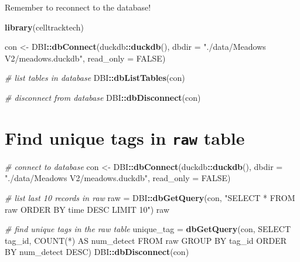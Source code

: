 \documentclass[
]{book}
\newenvironment{Shaded}{\begin{snugshade}}{\end{snugshade}}
\newcommand{\AttributeTok}[1]{\textcolor[rgb]{0.13,0.29,0.53}{#1}}
\newcommand{\CommentTok}[1]{\textcolor[rgb]{0.56,0.35,0.01}{\textit{#1}}}
\newcommand{\ConstantTok}[1]{\textcolor[rgb]{0.56,0.35,0.01}{#1}}
\newcommand{\FunctionTok}[1]{\textcolor[rgb]{0.13,0.29,0.53}{\textbf{#1}}}
\newcommand{\NormalTok}[1]{#1}
\newcommand{\OtherTok}[1]{\textcolor[rgb]{0.56,0.35,0.01}{#1}}
\newcommand{\SpecialCharTok}[1]{\textcolor[rgb]{0.81,0.36,0.00}{\textbf{#1}}}
\newcommand{\StringTok}[1]{\textcolor[rgb]{0.31,0.60,0.02}{#1}}
\begin{document}
Remember to reconnect to the database!

\begin{Shaded}
\begin{Highlighting}[]
\FunctionTok{library}\NormalTok{(celltracktech)}

\NormalTok{con }\OtherTok{\textless{}{-}}\NormalTok{ DBI}\SpecialCharTok{::}\FunctionTok{dbConnect}\NormalTok{(duckdb}\SpecialCharTok{::}\FunctionTok{duckdb}\NormalTok{(), }
                      \AttributeTok{dbdir =} \StringTok{"./data/Meadows V2/meadows.duckdb"}\NormalTok{, }
                      \AttributeTok{read\_only =} \ConstantTok{FALSE}\NormalTok{)}

\CommentTok{\# list tables in database}
\NormalTok{DBI}\SpecialCharTok{::}\FunctionTok{dbListTables}\NormalTok{(con)}

\CommentTok{\# disconnect from database}
\NormalTok{DBI}\SpecialCharTok{::}\FunctionTok{dbDisconnect}\NormalTok{(con)}
\end{Highlighting}
\end{Shaded}

\section{\texorpdfstring{Find unique tags in \texttt{raw} table}{Find unique tags in raw table}}\label{find-unique-tags-in-raw-table}

\begin{Shaded}
\begin{Highlighting}[]
\CommentTok{\# connect to database}
\NormalTok{con }\OtherTok{\textless{}{-}}\NormalTok{ DBI}\SpecialCharTok{::}\FunctionTok{dbConnect}\NormalTok{(duckdb}\SpecialCharTok{::}\FunctionTok{duckdb}\NormalTok{(), }
                      \AttributeTok{dbdir =} \StringTok{"./data/Meadows V2/meadows.duckdb"}\NormalTok{, }
                      \AttributeTok{read\_only =} \ConstantTok{FALSE}\NormalTok{)}

\CommentTok{\# list last 10 records in raw}
\NormalTok{raw }\OtherTok{=}\NormalTok{ DBI}\SpecialCharTok{::}\FunctionTok{dbGetQuery}\NormalTok{(con, }\StringTok{"SELECT * FROM raw}
\StringTok{                           ORDER BY time DESC}
\StringTok{                           LIMIT 10"}\NormalTok{)}
\NormalTok{raw}

\CommentTok{\# find unique tags in the raw table}
\NormalTok{unique\_tag }\OtherTok{=} \FunctionTok{dbGetQuery}\NormalTok{(con,}
                        \StringTok{\textquotesingle{}SELECT tag\_id, COUNT(*) AS num\_detect}
\StringTok{                        FROM raw}
\StringTok{                        GROUP BY tag\_id}
\StringTok{                        ORDER BY num\_detect DESC\textquotesingle{}}\NormalTok{)}
\NormalTok{DBI}\SpecialCharTok{::}\FunctionTok{dbDisconnect}\NormalTok{(con)}
\end{Highlighting}
\end{Shaded}
\end{document}
